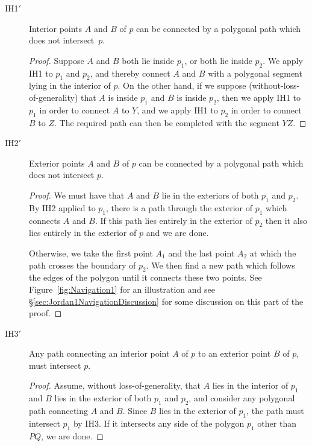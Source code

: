 \begin{description}
\item[IH{1}$'$] Interior points $A$ and $B$ of $p$ can be connected by a polygonal path which does not intersect~$p$.
  \begin{proof}
    Suppose $A$ and $B$ both lie inside $p_1$, or both lie inside $p_2$. We apply IH1 to $p_1$ and $p_2$, and thereby connect $A$ and $B$ with a polygonal segment lying in the interior of $p$. On the other hand, if we suppose (without-loss-of-generality) that $A$ is inside $p_1$ and $B$ is inside $p_2$, then we apply IH1 to $p_1$ in order to connect $A$ to $Y$, and we apply IH1 to $p_2$ in order to connect $B$ to $Z$. The required path can then be completed with the segment $YZ$.
  \end{proof}
\item[IH{2}$'$] Exterior points $A$ and $B$ of $p$ can be connected by a polygonal path which does not intersect $p$.
  \begin{proof}
    We must have that $A$ and $B$ lie in the exteriors of both $p_1$ and $p_2$. By IH2 applied to $p_1$, there is a path through the exterior of $p_1$ which connects $A$ and $B$. If this path lies entirely in the exterior of $p_2$ then it also lies entirely in the exterior of $p$ and we are done. 

    Otherwise, we take the first point $A_1$ and the last point $A_2$ at which the path crosses the boundary of $p_2$. We then find a new path which follows the edges of the polygon until it connects these two points. See Figure~\ref{fig:Navigation1} for an illustration and see \S\ref{sec:Jordan1NavigationDiscussion} for some discussion on this part of the proof.
  \end{proof}
\item[IH{3}$'$] Any path connecting an interior point $A$ of $p$ to an exterior point $B$ of $p$, must intersect $p$.
  \begin{proof}
    Assume, without loss-of-generality, that $A$ lies in the interior of $p_1$ and $B$ lies in the exterior of both $p_1$ and $p_2$, and consider any polygonal path connecting $A$ and $B$. Since $B$ lies in the exterior of $p_1$, the path must intersect $p_1$ by IH3. If it intersects any side of the polygon $p_1$ other than $PQ$, we are done.


\end{proof}
\end{description}
